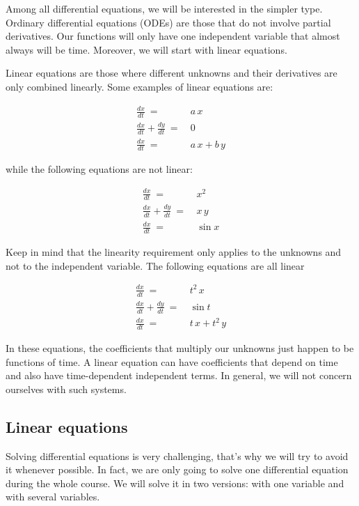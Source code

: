 \documentclass[12pt]{article}
\begin{document}
Among all differential equations, we will be interested in the simpler type. Ordinary differential equations (ODEs) are those that do not involve partial derivatives. Our functions will only have one independent variable that almost always will be time. Moreover, we will start with linear equations.

Linear equations are those where different unknowns and their derivatives are only combined linearly. Some examples of linear equations are:

\begin{align}
	\frac{dx}{dt} \: = \: &  a \, x	\nonumber\\
	\frac{dx}{dt} + \frac{dy}{dt}\: = \: &  0 \nonumber\\
	\frac{dx}{dt} \: = \: &  a \, x + b \, y \nonumber
\end{align}

while the following equations are not linear:

\begin{align}
	\frac{dx}{dt} \: = \: &  x^2	\nonumber\\
	\frac{dx}{dt} + \frac{dy}{dt}\: = \: &  x \, y \nonumber\\
	\frac{dx}{dt} \: = \: &  \sin x \nonumber
\end{align}

Keep in mind that the linearity requirement only applies to the unknowns and not to the independent variable. The following equations are all linear


\begin{align}
	\frac{dx}{dt} \: = \: &  t^2 \, x	\nonumber\\
	\frac{dx}{dt} + \frac{dy}{dt}\: = \: &  \sin t \nonumber\\
	\frac{dx}{dt} \: = \: &  t \, x + t^2 \, y \nonumber
\end{align}

In these equations, the coefficients that multiply our unknowns just happen to be functions of time. A linear equation can have coefficients that depend on time and also have time-dependent independent terms. In general, we will not concern ourselves with such systems.

\subsection{Linear equations}

Solving differential equations is very challenging, that's why we will try to avoid it whenever possible. In fact, we are only going to solve one differential equation during the whole course. We will solve it in two versions: with one variable and with several variables.
\end{document}
